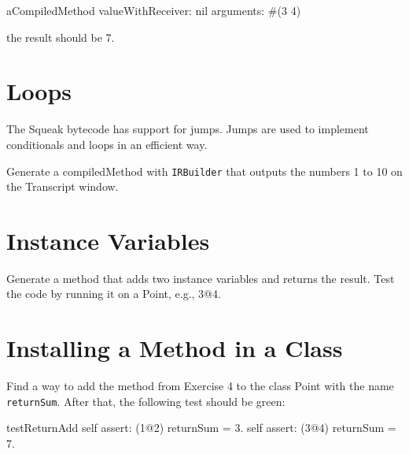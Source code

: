 \begin{scode}
aCompiledMethod valueWithReceiver: nil arguments: #(3 4)
\end{scode}

the result should be 7.


\section{Loops}
The Squeak bytecode has support for jumps. Jumps are used to implement conditionals and
loops in an efficient way.

Generate a compiledMethod with {\tt  IRBuilder} that outputs the numbers 1 to 10 on the Transcript window. 

%



\section{Instance Variables}
Generate a method that adds two instance variables and returns the result. Test the code by running
it on a Point, e.g., 3@4.




\section{Installing a Method in a Class}
Find a way to add the method from Exercise 4 to the class Point with the name {\tt returnSum}. After
that, the following test should be green:

\begin{scode}
testReturnAdd
   self assert: (1@2) returnSum = 3.
   self assert: (3@4) returnSum = 7.
\end{scode}

